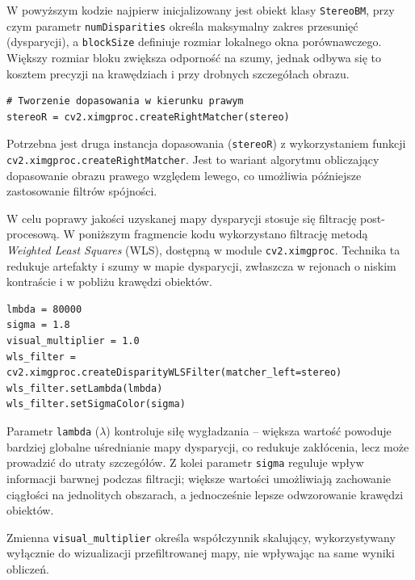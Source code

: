 \documentclass[magisterska]{pracadypl}
\begin{document}
W powyższym kodzie najpierw inicjalizowany jest obiekt klasy \texttt{StereoBM}, przy czym parametr \texttt{numDisparities} określa maksymalny zakres przesunięć (dysparycji), a \texttt{blockSize} definiuje rozmiar lokalnego okna porównawczego. Większy rozmiar bloku zwiększa odporność na szumy, jednak odbywa się to kosztem precyzji na krawędziach i przy drobnych szczegółach obrazu.  

\begin{lstlisting}[style=mypython]
# Tworzenie dopasowania w kierunku prawym
stereoR = cv2.ximgproc.createRightMatcher(stereo)
\end{lstlisting}

Potrzebna jest druga instancja dopasowania (\texttt{stereoR}) z wykorzystaniem funkcji \texttt{cv2.ximgproc.createRightMatcher}. Jest to wariant algorytmu obliczający dopasowanie obrazu prawego względem lewego, co umożliwia późniejsze zastosowanie filtrów spójności. 

W celu poprawy jakości uzyskanej mapy dysparycji stosuje się filtrację post-procesową. W poniższym fragmencie kodu wykorzystano filtrację metodą \textit{Weighted Least Squares} (WLS), dostępną w module \texttt{cv2.ximgproc}. Technika ta redukuje artefakty i szumy w mapie dysparycji, zwłaszcza w rejonach o niskim kontraście i w pobliżu krawędzi obiektów.  

\begin{lstlisting}[style=mypython]
lmbda = 80000
sigma = 1.8
visual_multiplier = 1.0
wls_filter = cv2.ximgproc.createDisparityWLSFilter(matcher_left=stereo)
wls_filter.setLambda(lmbda)
wls_filter.setSigmaColor(sigma)
\end{lstlisting}

Parametr \texttt{lambda} (\( \lambda \)) kontroluje siłę wygładzania – większa wartość powoduje bardziej globalne uśrednianie mapy dysparycji, co redukuje zakłócenia, lecz może prowadzić do utraty szczegółów. Z kolei parametr \texttt{sigma} reguluje wpływ informacji barwnej podczas filtracji; większe wartości umożliwiają zachowanie ciągłości na jednolitych obszarach, a jednocześnie lepsze odwzorowanie krawędzi obiektów.  

Zmienna \texttt{visual\_multiplier} określa współczynnik skalujący, wykorzystywany wyłącznie do wizualizacji przefiltrowanej mapy, nie wpływając na same wyniki obliczeń.  
\end{document}
